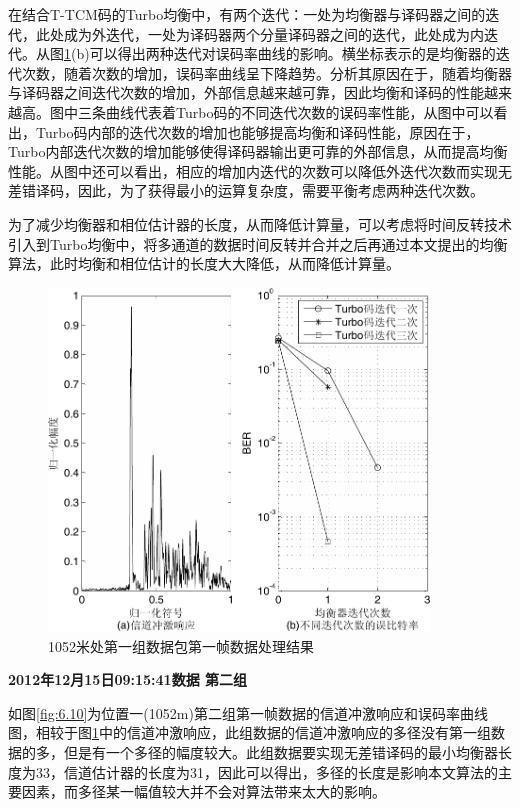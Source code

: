 在结合T-TCM码的Turbo均衡中，有两个迭代：一处为均衡器与译码器之间的迭代，此处成为外迭代，一处为译码器两个分量译码器之间的迭代，此处成为内迭代。从图\ref{fig:6.9}(b)可以得出两种迭代对误码率曲线的影响。横坐标表示的是均衡器的迭代次数，随着次数的增加，误码率曲线呈下降趋势。分析其原因在于，随着均衡器与译码器之间迭代次数的增加，外部信息越来越可靠，因此均衡和译码的性能越来越高。图中三条曲线代表着Turbo码的不同迭代次数的误码率性能，从图中可以看出，Turbo码内部的迭代次数的增加也能够提高均衡和译码性能，原因在于，Turbo内部迭代次数的增加能够使得译码器输出更可靠的外部信息，从而提高均衡性能。从图中还可以看出，相应的增加内迭代的次数可以降低外迭代次数而实现无差错译码，因此，为了获得最小的运算复杂度，需要平衡考虑两种迭代次数。

为了减少均衡器和相位估计器的长度，从而降低计算量，可以考虑将时间反转技术引入到Turbo均衡中，将多通道的数据时间反转并合并之后再通过本文提出的均衡算法，此时均衡和相位估计的长度大大降低，从而降低计算量。

\begin{figure}[htb]
  \begin{center}
    \includegraphics[width=0.9\textwidth]{images/result_1_1.pdf}
  \end{center}
  \caption{1052米处第一组数据包第一帧数据处理结果}
  \label{fig:6.9}
\end{figure}

\textbf{\sihao 2012年12月15日09:15:41数据 第二组} 

如图\ref{fig:6.10}为位置一(1052m)第二组第一帧数据的信道冲激响应和误码率曲线图，相较于图\ref{fig:6.9}中的信道冲激响应，此组数据的信道冲激响应的多径没有第一组数据的多，但是有一个多径的幅度较大。此组数据要实现无差错译码的最小均衡器长度为33，信道估计器的长度为31，因此可以得出，多径的长度是影响本文算法的主要因素，而多径某一幅值较大并不会对算法带来太大的影响。

